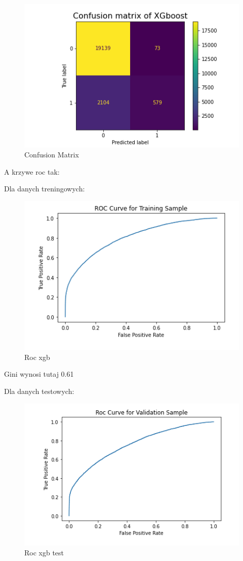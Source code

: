 \documentclass[11pt]{article}
\begin{document}
\begin{figure}
\centering
\includegraphics{plots/conf-mat-xgboost.png}
\caption{Confusion Matrix}
\end{figure}

A krzywe roc tak:

Dla danych treningowych:

\begin{figure}
\centering
\includegraphics{plots/roc_train_xgboost.png}
\caption{Roc xgb}
\end{figure}

Gini wynosi tutaj 0.61

Dla danych testowych:

\begin{figure}
\centering
\includegraphics{plots/roc_test_xgboost.png}
\caption{Roc xgb test}
\end{figure}
\end{document}
